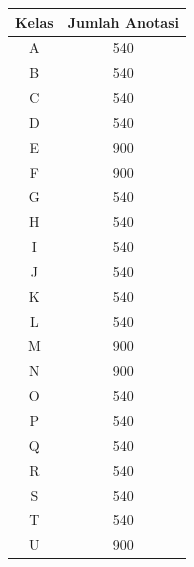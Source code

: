 \begin{center}
  \begin{longtable}{|c|c|}
  \hline
  \textbf{Kelas} & \textbf{Jumlah Anotasi} \\ \hline
  A                                    & 540                     \\ \hline
  B                                    & 540                     \\ \hline
  C                                    & 540                     \\ \hline
  D                                    & 540                     \\ \hline
  E                                    & 900                     \\ \hline
  F                                    & 900                     \\ \hline
  G                                    & 540                     \\ \hline
  H                                    & 540                     \\ \hline
  I                                    & 540                     \\ \hline
  J                                    & 540                     \\ \hline
  K                                    & 540                     \\ \hline
  L                                    & 540                     \\ \hline
  M                                    & 900                     \\ \hline
  N                                    & 900                     \\ \hline
  O                                    & 540                     \\ \hline
  P                                    & 540                     \\ \hline
  Q                                    & 540                     \\ \hline
  R                                    & 540                     \\ \hline
  S                                    & 540                     \\ \hline
  T                                    & 540                     \\ \hline
  U                                    & 900                     \\ \hline

\end{longtable}
\end{center}
